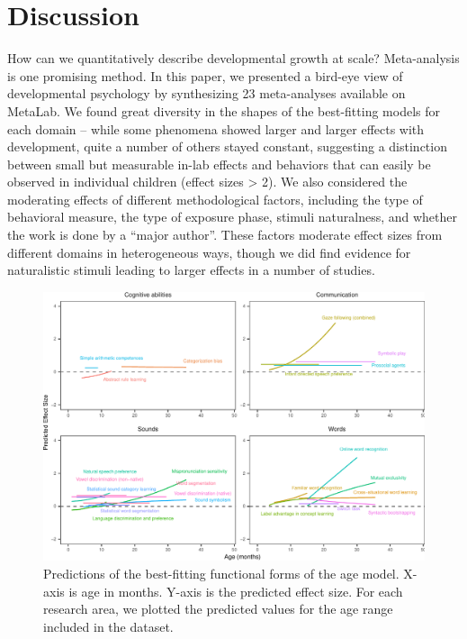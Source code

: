 \documentclass[10pt, letterpaper]{article}
\newenvironment{CodeChunk}{}{}
\begin{document}
\hypertarget{discussion}{%
\section{Discussion}\label{discussion}}

How can we quantitatively describe developmental growth at scale?
Meta-analysis is one promising method. In this paper, we presented a
bird-eye view of developmental psychology by synthesizing 23
meta-analyses available on MetaLab. We found great diversity in the
shapes of the best-fitting models for each domain -- while some
phenomena showed larger and larger effects with development, quite a
number of others stayed constant, suggesting a distinction between small
but measurable in-lab effects and behaviors that can easily be observed
in individual children (effect sizes \textgreater{} 2). We also
considered the moderating effects of different methodological factors,
including the type of behavioral measure, the type of exposure phase,
stimuli naturalness, and whether the work is done by a ``major author''.
These factors moderate effect sizes from different domains in
heterogeneous ways, though we did find evidence for naturalistic stimuli
leading to larger effects in a number of studies.

\begin{CodeChunk}
\begin{figure}[h!]

{\centering \includegraphics{figs/2-col-imageb-1} 

}

\caption[Predictions of the best-fitting functional forms of the age model]{Predictions of the best-fitting functional forms of the age model. X-axis is age in months. Y-axis is the predicted effect size. For each research area, we plotted the predicted values for the age range included in the dataset.}\label{fig:2-col-imageb}
\end{figure}
\end{CodeChunk}
\end{document}
